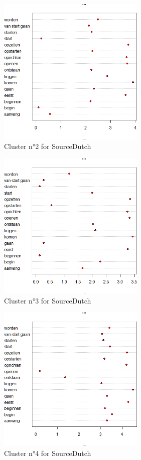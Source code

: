 \begin{figure}
\includegraphics[width=7cm]{figures/Vandevoorde2-img57.png}
\caption{\label{fig:4:57}Cluster n°2 for SourceDutch}
\end{figure}

\begin{figure}
\includegraphics[width=7cm]{figures/Vandevoorde2-img58.png}
\caption{\label{fig:4:58}Cluster n°3 for SourceDutch}
\end{figure}

\begin{figure}
\includegraphics[width=7cm]{figures/Vandevoorde2-img59.png}
\caption{\label{fig:4:59}Cluster n°4 for SourceDutch}
\end{figure}

